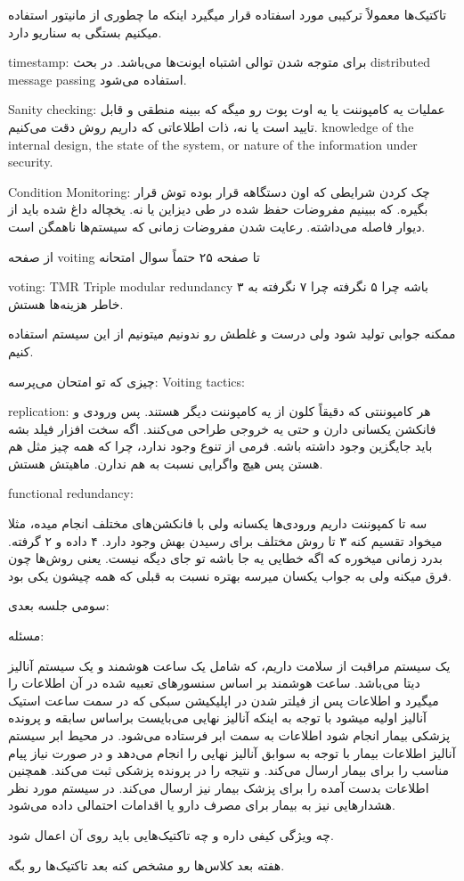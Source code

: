 تاکتیک‌ها معمولاً ترکیبی مورد اسفتاده قرار میگیرد اینکه ما چطوری از مانیتور
استفاده میکنیم بستگی به سناریو دارد.

timestamp: برای متوجه شدن توالی اشتباه ایونت‌ها می‌باشد. در بحث distributed
message passing استفاده می‌شود.

Sanity checking: عملیات یه کامپوننت یا یه اوت پوت رو میگه که ببینه منطقی و قابل
تایید است یا نه، ذات اطلاعاتی که داریم روش دقت می‌کنیم. knowledge of the
internal design, the state of the system, or nature of the information under
security.

Condition Monitoring: چک کردن شرایطی که اون دستگاهه قرار بوده توش قرار بگیره. که
ببینیم مفروضات حفظ شده در طی دیزاین یا نه. یخچاله داغ شده باید از دیوار فاصله
می‌داشته. رعایت شدن مفروضات زمانی که سیستم‌ها ناهمگن است.

از صفحه voiting تا صفحه ۲۵ حتماً سوال امتحانه

voting: TMR Triple modular redundancy ۳ باشه چرا ۵ نگرفته چرا ۷ نگرفته به خاطر
هزینه‌ها هستش.

ممکنه جوابی تولید شود ولی درست و غلطش رو ندونیم میتونیم از این سیستم استفاده
کنیم. 

چیزی که تو امتحان می‌پرسه:
Voiting tactics:

replication: هر کامپوننتی که دقیقاً کلون از یه کامپوننت دیگر هستند. پس ورودی و
فانکشن یکسانی دارن و حتی یه خروجی طراحی می‌کنند. اگه سخت افزار فیلد بشه باید
جایگزین وجود داشته باشه. فرمی از تنوع وجود ندارد، چرا که همه چیز مثل هم هستن پس
هیچ واگرایی نسبت به هم ندارن. ماهیتش هستش.

functional redundancy:

سه تا کمپوننت داریم ورودی‌ها یکسانه ولی با فانکشن‌های مختلف انجام میده، مثلا
میخواد تقسیم کنه ۳ تا روش مختلف برای رسیدن بهش وجود دارد. ۴ داده و ۲ گرفته. بدرد
زمانی میخوره که اگه خطایی یه جا باشه تو جای دیگه نیست. یعنی روش‌ها چون فرق میکنه
ولی به جواب یکسان میرسه بهتره نسبت به قبلی که همه چیشون یکی بود.

سومی جلسه بعدی:

مسئله:

یک سیستم مراقبت از سلامت داریم، که شامل یک ساعت هوشمند و یک سیستم آنالیز دیتا
می‌باشد. ساعت هوشمند بر اساس سنسور‌های تعبیه شده در آن اطلاعات را میگیرد و
اطلاعات پس از فیلتر شدن در اپلیکیشن سبکی که در سمت ساعت استیک آنالیز اولیه میشود
با توجه به اینکه آنالیز نهایی می‌بایست براساس سابقه و پرونده پزشکی بیمار انجام
شود اطلاعات به سمت ابر فرستاده می‌شود. در محیط ابر سیستم آنالیز اطلاعات بیمار با
توجه به سوابق آنالیز نهایی را انجام می‌دهد و در صورت نیاز پیام مناسب را برای
بیمار ارسال می‌کند. و نتیجه را در پرونده پزشکی ثبت می‌کند. همچنین اطلاعات بدست
آمده را برای پزشک بیمار نیز ارسال می‌کند. در سیستم مورد نظر هشدار‌هایی نیز به
بیمار برای مصرف دارو یا اقدامات احتمالی داده می‌شود.

چه ویژگی کیفی داره و چه تاکتیک‌هایی باید روی آن اعمال شود.

هفته بعد کلاس‌ها رو مشخص کنه بعد تاکتیک‌ها رو بگه.
